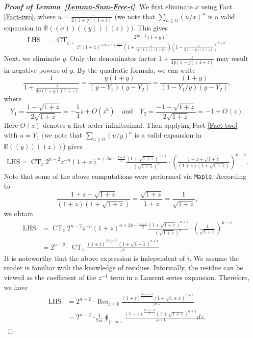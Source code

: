 \documentclass[reqno, 12pt]{article}
\theoremstyle{mydefinition}
\theoremstyle{myremark}
\numberwithin{algorithm}{section}
\begin{document}
\begin{proof}[{\bf Proof of Lemma~\ref{Lemma-Sum-Free-i}}]
We first eliminate $x$ using Fact \ref{Fact-two}, where $u=\frac{-z}{2(1+y)(1+z)}$ (we note that $\sum_{n\ge 0} (u/x)^n$ is a valid expansion in $\mathbb{R}((x))((y))((z))$). This gives
\begin{align*}
\mathrm{LHS}&=\mathop{\mathrm{CT}}_{y,z}\frac{2^{2n-1}(1+y)^n}{z^n(1+z)^{-2k-n+\frac{i+3}{2}}\left( 1+\frac{z}{4y(1+z)(1+y)}\right) \left(1-\frac{z}{2(1+y)(1+z)}\right)^{i-k}}.
\end{align*}
Next, we eliminate $y$. Only the denominator factor $1+\frac{z}{4y(1+y)(1+z)}$ may result in negative powers of $y$. By the quadratic formula, we can write
$$\frac{1}{1+\frac{z}{4y(1+y)(1+z)}} = \frac{y(1+y)}{(y-Y_1)(y-Y_2)} = \frac{(1+y)}{(1-Y_1/y)(y-Y_2)},$$
where
$$Y_1=\frac{1-\sqrt{1+z}}{2\sqrt{1+z}} =-\frac{1}{4}z+O(z^2) \quad \text{and}\quad Y_2=\frac{-1-\sqrt{1+z}}{2\sqrt{1+z}}=-1+O(z).$$
Here $O(z)$ denotes a first-order infinitesimal.
Then applying Fact \ref{Fact-two} with $u=Y_1$ (we note that $\sum_{n\ge 0} (u/y)^n$ is a valid expansion in $\mathbb{R}((y))((z))$) gives
\begin{align*}
\mathrm{LHS}=\mathop{\mathrm{CT}}_{z} 2^{n-2}z^{-n}(1+z)^{n+2k-\frac{i+3}{2}}\frac{(1+\sqrt{1+z})^{n+1}}{(\sqrt{1+z})^n}\cdot \left( \frac{1+z+\sqrt{1+z}}{(1+z)(1+\sqrt{1+z})} \right)^{k-i}.
\end{align*}
Note that some of the above computations were performed via \texttt{Maple}.
According to
$$\frac{1+z+\sqrt{1+z}}{(1+z)(1+\sqrt{1+z})}=\frac{\sqrt{1+z}}{1+z}=\frac{1}{\sqrt{1+z}},$$
we obtain
\begin{align*}
\mathrm{LHS} &=\mathop{\mathrm{CT}}_{z} 2^{n-2}z^{-n}(1+z)^{n+2k-\frac{i+3}{2}}\frac{(1+\sqrt{1+z})^{n+1}}{(\sqrt{1+z})^n}\cdot \left( \frac{1}{\sqrt{1+z}} \right)^{k-i}
\\ &=2^{n-2}\cdot\mathop{\mathrm{CT}}_{z} \frac{(1+z)^{\frac{3k+n-3}{2}} (1+\sqrt{1+z})^{n+1}}{z^n}.
\end{align*}
It is noteworthy that the above expression is independent of $i$.
We assume the reader is familiar with the knowledge of residues.
Informally, the residue can be viewed as the coefficient of the $z^{-1}$ term in a Laurent series expansion.
Therefore, we have
\begin{align*}
\mathrm{LHS} &=2^{n-2}\cdot\mathop{\mathrm{Res}}_{z=0} \frac{(1+z)^{\frac{3k+n-3}{2}} (1+\sqrt{1+z})^{n+1}}{z^{n+1}}
\\ &= 2^{n-2}\cdot \frac{1}{2\pi i}\oint_{|z|=\varepsilon} \frac{(1+z)^{\frac{3k+n-3}{2}} (1+\sqrt{1+z})^{n+1}}{z^{n+1}} dz,
\end{align*}

\end{proof}
\end{document}
